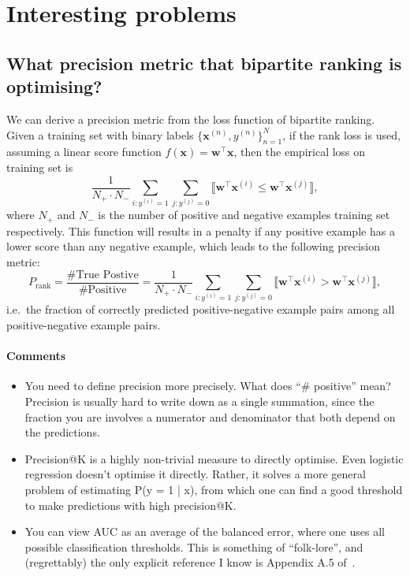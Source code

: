 \documentclass[9pt]{extarticle}
\newcommand{\llb}{\llbracket}
\newcommand{\rrb}{\rrbracket}
\newcommand{\x}{\mathbf{x}}
\newcommand{\1}{\mathbf{1}}
\newcommand{\w}{\mathbf{w}}
\newcommand{\pb}[1]{^{({#1})}}
\newcommand{\ie}{i.e.\ }
\begin{document}
\newpage
\thispagestyle{empty}

\section*{Interesting problems}

\subsection*{What precision metric that bipartite ranking is optimising?}

We can derive a precision metric from the loss function of bipartite ranking.
Given a training set with binary labels $\{\x\pb{n}, y\pb{n}\}_{n=1}^N$, 
if the rank loss is used, assuming a linear score function $f(\x) = \w^\top \x$, 
then the empirical loss on training set is 
\begin{equation*}
\frac{1}{N_+ \cdot N_-} \sum_{i:y\pb{i}=1} \sum_{j:y\pb{j}=0} \llb \w^\top\x\pb{i} \le \w^\top\x\pb{j} \rrb,
\end{equation*}
where $N_+$ and $N_-$ is the number of positive and negative examples training set respectively.
This function will results in a penalty if any positive example has a lower score than any negative example,
which leads to the following precision metric:
\begin{equation}
\label{eq:precision_rank}
P_\text{rank} = \frac{\text{\#True Postive}}{\text{\#Positive}} 
              = \frac{1}{N_+ \cdot N_-} \sum_{i:y\pb{i}=1} \sum_{j:y\pb{j}=0} \llb \w^\top\x\pb{i} > \w^\top\x\pb{j} \rrb,
\end{equation}
\ie the fraction of correctly predicted positive-negative example pairs among all positive-negative example pairs.

\paragraph{Comments}
{\it
\begin{itemize}
\item You need to define precision more precisely. What does ``\# positive'' mean? Precision is usually hard to write down as a single summation, since the fraction you are involves a numerator and denominator that both depend on the predictions.
\item Precision@K is a highly non-trivial measure to directly optimise. Even logistic regression doesn't optimise it directly. Rather, it solves a more general problem of estimating P(y = 1 | x), from which one can find a good threshold to make predictions with high precision@K.
\item You can view AUC as an average of the balanced error, where one uses all possible classification thresholds. This is something of ``folk-lore'', and (regrettably) the only explicit reference I know is Appendix A.5 of~\cite{menon2015learning}.
\end{itemize}
}
\end{document}
